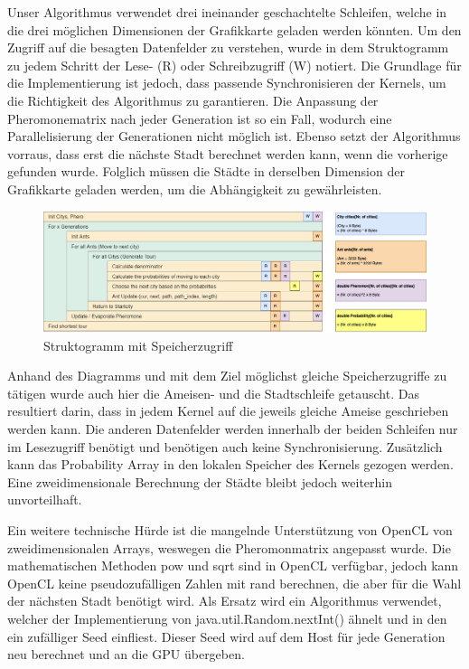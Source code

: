 Unser Algorithmus verwendet drei ineinander geschachtelte Schleifen, welche in die drei möglichen Dimensionen der Grafikkarte geladen werden könnten.
Um den Zugriff auf die besagten Datenfelder zu verstehen, wurde in dem Struktogramm zu jedem Schritt der Lese- (R) oder Schreibzugriff (W) notiert.
Die Grundlage für die Implementierung ist jedoch, dass passende Synchronisieren der Kernels, um die Richtigkeit des Algorithmus zu garantieren.
Die Anpassung der Pheromonematrix nach jeder Generation ist so ein Fall, wodurch eine Parallelisierung der Generationen nicht möglich ist.
Ebenso setzt der Algorithmus vorraus, dass erst die nächste Stadt berechnet werden kann, wenn die vorherige gefunden wurde.
Folglich müssen die Städte in derselben Dimension der Grafikkarte geladen werden, um die Abhängigkeit zu gewährleisten.

\begin{figure}[h]
    \centering
    \includegraphics[width=\textwidth]{../images/Speicherzugriff-optimiert.png}
    \caption{Struktogramm mit Speicherzugriff}
    \label{fig:struktogramm-speicher}
\end{figure}

Anhand des Diagramms und mit dem Ziel möglichst gleiche Speicherzugriffe zu tätigen wurde auch hier die Ameisen- und die Stadtschleife getauscht.
Das resultiert darin, dass in jedem Kernel auf die jeweils gleiche Ameise geschrieben werden kann.
Die anderen Datenfelder werden innerhalb der beiden Schleifen nur im Lesezugriff benötigt und benötigen auch keine Synchronisierung.
Zusätzlich kann das Probability Array in den lokalen Speicher des Kernels gezogen werden.
Eine zweidimensionale Berechnung der Städte bleibt jedoch weiterhin unvorteilhaft.

Ein weitere technische Hürde ist die mangelnde Unterstützung von OpenCL von zweidimensionalen Arrays, weswegen die Pheromonmatrix angepasst wurde.
Die mathematischen Methoden pow und sqrt sind in OpenCL verfügbar, jedoch kann OpenCL keine pseudozufälligen Zahlen mit rand berechnen, die aber für die Wahl der nächsten Stadt benötigt wird.
Als Ersatz wird ein Algorithmus verwendet, welcher der Implementierung von java.util.Random.nextInt() ähnelt und in den ein zufälliger Seed einfliest.
Dieser Seed wird auf dem Host für jede Generation neu berechnet und an die GPU übergeben.


